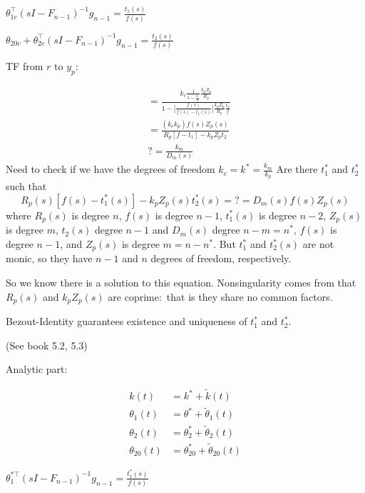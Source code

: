 
$\theta_{1c}^{\top}(sI-F_{n-1})^{-1}g_{n-1}=\frac{t_{1}(s)}{f(s)}$

$\theta_{20c}+\theta_{2c}^{\top}(sI-F_{n-1})^{-1}g_{n-1}=\frac{t_{2}(s)}{f(s)}$

TF from $r$ to $y_{p}$:

\begin{align*}
  &=\frac{k_{c}\frac{1}{1-\frac{t_{1}}{f}}\frac{k_{p}Z_{p}}{R_{p}}}{1-\bigr[\frac{f(s)}{f(s)-t_{1}(s)}\bigr]\frac{k_{p}Z_{p}}{R_{p}}\frac{t_{2}}{f}} \\
  &=\frac{(k_{c}k_{p})f(s)Z_{p}(s)}{R_{p}[f-t_{1}]-k_{p}Z_{p}t_{2}} \\
  &?=\frac{k_{m}}{D_{m}(s)}
\end{align*}
Need to check if we have the degrees of freedom
$k_{c}=k^{*}=\frac{k_{m}}{k_{p}}$
Are there $t_{1}^{*}$ and $t_{2}^{*}$ such that
\begin{equation*}
R_{p}(s)[f(s)-t_{1}^{*}(s)]-k_{p}Z_{p}(s)t_{2}^{*}(s)=?=D_{m}(s)f(s)Z_{p}(s)
\end{equation*}
where $R_{p}(s)$ is degree $n$, $f(s)$ is degree $n-1$, $t_{1}^{*}(s)$ is degree $n-2$, $Z_{p}(s)$ is degree $m$, $t_{2}(s)$ degree $n-1$ and $D_{m}(s)$ degree $n-m=n^{*}$, $f(s)$ is degree $n-1$, and $Z_{p}(s)$ is degree $m=n-n^{*}$.
But $t_{1}^{*}$ and $t_{2}^{*}(s)$ are not monic, so they have $n-1$ and $n$ degrees of freedom, respectively.

So we know there is a solution to this equation.
Nonsingularity comes from that $R_{p}(s)$ and $k_{p}Z_{p}(s)$ are coprime:\ that is they share no common factors.

Bezout-Identity guarantees existence and uniqueness of $t_{1}^{*}$ and $t_{2}^{*}$.

(See book 5.2, 5.3)

Analytic part:


\begin{align*}
  k(t)&=k^{*}+\tilde{k}(t) \\
  \theta_{1}(t)&=\theta^{*}+\tilde{\theta}_{1}(t) \\
  \theta_{2}(t)&=\theta_{2}^{*}+\tilde{\theta}_{2}(t) \\
  \theta_{20}(t)&=\theta_{20}^{*}+\tilde{\theta}_{20}(t)
\end{align*}

$\theta_{1}^{*\top}(sI-F_{n-1})^{-1}g_{n-1}=\frac{t_{1}^{*}(s)}{f(s)}$

